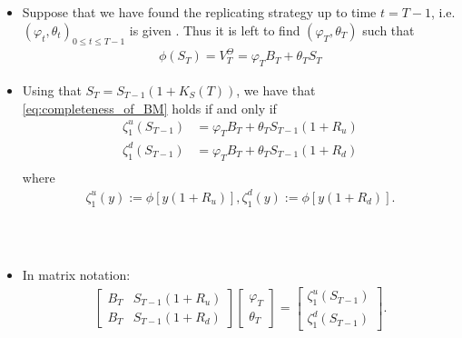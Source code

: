 \documentclass{beamer}
\numberwithin{equation}{section}
\begin{document}
\begin{frame}\frametitle{{\normalsize \secname} \\ {\large \subsecname}}
    \begin{itemize}
        \item <1-> Suppose that we have found the replicating strategy up to time $t = T-1$, i.e. $(\varphi_t, \theta_t)_{0 \leq t \leq T-1}$ is given . Thus it is left to find $(\varphi_T, \theta_T)$ such that
        \begin{align}\label{eq:completeness_of_BM}
            \phi(S_T) = V_T^{\Theta} = \varphi_TB_T + \theta_TS_T
        \end{align}
                \item <1-> Using that $S_T = S_{T-1}(1+K_S(T))$, we have that \eqref{eq:completeness_of_BM} holds if and only if
                \begin{align*}
            \zeta^u_1(S_{T-1}) &= \varphi_T B_T  + \theta_T S_{T-1}(1+R_u)\\
            \zeta^d_1(S_{T-1}) &= \varphi_T B_T  + \theta_T S_{T-1}(1+R_d)\\
        \end{align*}
        where
        \begin{align*}
            \zeta_1^u(y) := \phi[y(1 + R_u)], \zeta_1^d(y):= \phi[y(1 + R_d)].
        \end{align*}
    \end{itemize}
\end{frame}

\begin{frame}\frametitle{{\normalsize \secname} \\ {\large \subsecname}}
    \begin{itemize}
        \item <1-> In matrix notation:
        \begin{align*}
            \begin{bmatrix} B_T & S_{T-1}(1 + R_u)\\ B_T & S_{T-1}(1 + R_d)\end{bmatrix} \begin{bmatrix} \varphi_T \\ \theta_T \end{bmatrix} = \begin{bmatrix} \zeta^u_1 (S_{T-1})\\ \zeta^d_1(S_{T-1})\end{bmatrix}.
        \end{align*}
    \end{itemize}
\end{frame}
\end{document}
